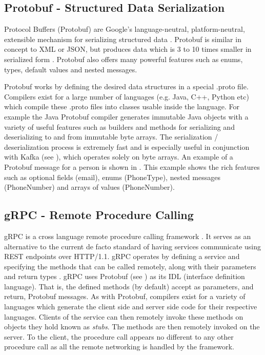 \subsection{Protobuf - Structured Data Serialization}\label{sec:protobuf}
Protocol Buffers (Protobuf) are Google's language-neutral, platform-neutral, extensible mechanism for serializing structured data \cite{protobuf}. Protobuf is similar in concept to XML or JSON, but produces data which is 3 to 10 times smaller in serialized form \cite{protobufSizeStat}. Protobuf also offers many powerful features such as enums, types, default values and nested messages.

Protobuf works by defining the desired data structures in a special .proto file. Compilers exist for a large number of languages (e.g. Java, C++, Python etc) which compile these .proto files into classes usable inside the language. For example the Java Protobuf compiler generates immutable Java objects with a variety of useful features such as builders and methods for serializing and deserializing to and from immutable byte arrays. The serialization / deserialization process is extremely fast and is especially useful in conjunction with Kafka (see ), which operates solely on byte arrays. An example of a Protobuf message for a person is shown in . This example shows the rich features such as optional fields (email), enums (PhoneType), nested messages (PhoneNumber) and arrays of values (PhoneNumber).



\subsection{gRPC - Remote Procedure Calling}
gRPC is a cross language remote procedure calling framework \cite{gRPC}. It serves as an alternative to the current de facto standard of having services communicate using REST endpoints over HTTP/1.1. gRPC operates by defining a service and specifying the methods that can be called remotely, along with their parameters and return types \cite{gRPCDef}. gRPC uses Protobuf (see ) as its IDL (interface definition language). That is, the defined methods (by default) accept as parameters, and return, Protobuf messages. As with Protobuf, compilers exist for a variety of languages which generate the client side and server side code for their respective languages. Clients of the service can then remotely invoke these methods on objects they hold known as \textit{stubs}. The methods are then remotely invoked on the server. To the client, the procedure call appears no different to any other procedure call as all the remote networking is handled by the framework. 

